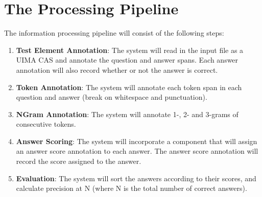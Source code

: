 \section{The Processing Pipeline}


The information processing pipeline will consist of the following steps:

\begin{enumerate}
  \item {\bfseries Test Element Annotation}: The system will read in the input file as a UIMA CAS
and annotate the question and answer spans. Each answer annotation will also
record whether or not the answer is correct. 
\item {\bfseries Token Annotation}: The system will annotate each token span in each question
and answer (break on whitespace and punctuation). 
\item {\bfseries NGram Annotation}: The system will annotate 1-, 2- and 3-grams of consecutive
tokens. 
\item {\bfseries Answer Scoring}: The system will incorporate a component that will assign an
answer score annotation to each answer. The answer score annotation will record
the score assigned to the answer. 
\item {\bfseries Evaluation}: The system will sort the answers according to their scores, and
calculate precision at N (where N is the total number of correct answers).
\end{enumerate}


